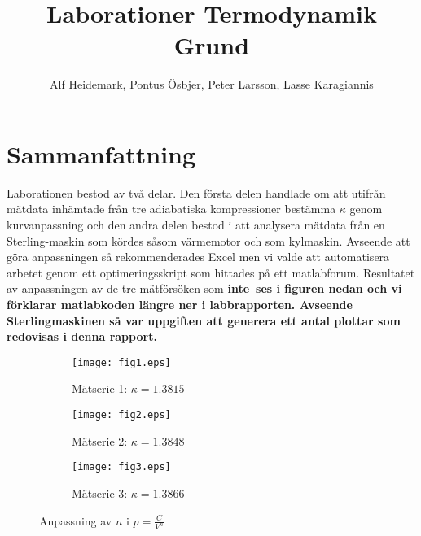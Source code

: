 \documentclass[11pt,a4paper]{article}
\title{Laborationer Termodynamik Grund}
\author{Alf Heidemark, Pontus Ösbjer, Peter Larsson, Lasse Karagiannis}
\begin{document}
\maketitle
\section{Sammanfattning}
Laborationen bestod av två delar. Den första delen handlade om att utifrån
mätdata inhämtade från tre adiabatiska kompressioner bestämma $\kappa$ genom
kurvanpassning och den andra delen bestod i att analysera mätdata från en 
Sterling-maskin som kördes såsom värmemotor och som kylmaskin.
Avseende att göra anpassningen så rekommenderades Excel men vi valde att automatisera
arbetet genom ett optimeringsskript som hittades på ett matlabforum\footnotemark{}.
Resultatet av anpassningen av de tre mätförsöken som \bf{inte}\rm ~ses i figuren nedan och vi förklarar matlabkoden
längre ner i labbrapporten.
Avseende Sterlingmaskinen så var uppgiften att generera ett antal plottar som redovisas
i denna rapport.



\begin{figure}[h]
\centering
\begin{subfigure}{0.3\textwidth}
    \texttt{[image: fig1.eps]}
    \caption{Mätserie 1: $\kappa =1.3815$}
    \label{fig:first}
\end{subfigure}
\begin{subfigure}{0.3\textwidth}
    \texttt{[image: fig2.eps]}
    \caption{Mätserie 2: $\kappa=1.3848$}
    \label{fig:second}
\end{subfigure}
\begin{subfigure}{0.3\textwidth}
    \texttt{[image: fig3.eps]}
    \caption{Mätserie 3: $\kappa=1.3866$}
    \label{fig:third}
\end{subfigure}
        
\caption{Anpassning av $n$ i $p=\frac{C}{V^n}$}
\label{fig:figures}
\end{figure}
\end{document}
